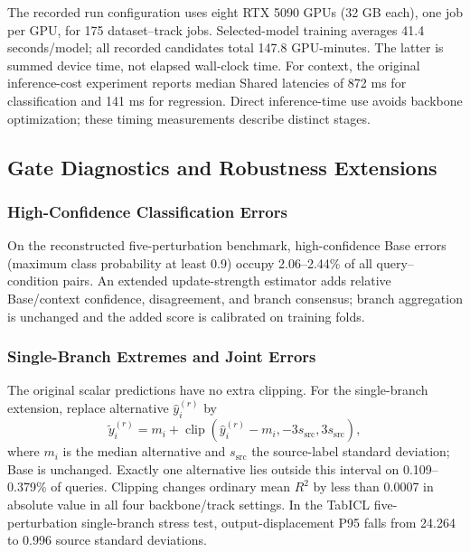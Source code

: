 


The recorded run configuration uses eight RTX 5090 GPUs (32 GB each), one job
per GPU, for 175 dataset--track jobs. Selected-model training averages
41.4 seconds/model; all recorded candidates total 147.8 GPU-minutes. The latter
is summed device time, not elapsed wall-clock time. For context, the original
inference-cost experiment reports median Shared latencies of 872 ms for
classification and 141 ms for regression. Direct inference-time use avoids
backbone optimization; these timing measurements describe distinct stages.

\subsection{Gate Diagnostics and Robustness Extensions}
\label{app:revision-gate}
\subsubsection{High-Confidence Classification Errors}
\label{app:revision-high-confidence}
On the reconstructed five-perturbation benchmark, high-confidence Base errors
(maximum class probability at least 0.9) occupy 2.06--2.44\% of all
query--condition pairs. An extended update-strength estimator adds relative
Base/context confidence, disagreement, and branch consensus; branch aggregation
is unchanged and the added score is calibrated on training folds.




\subsubsection{Single-Branch Extremes and Joint Errors}
\label{app:revision-regression-robustness}
The original scalar predictions have no extra clipping. For the single-branch
extension, replace alternative $\widehat y_i^{(r)}$ by
\[
\widetilde y_i^{(r)}=m_i+\operatorname{clip}
 (\widehat y_i^{(r)}-m_i,-3s_{\mathrm{src}},3s_{\mathrm{src}}),
\]
where $m_i$ is the median alternative and $s_{\mathrm{src}}$ the source-label
standard deviation; Base is unchanged. Exactly one alternative lies outside
this interval on 0.109--0.379\% of queries. Clipping changes ordinary mean
$R^2$ by less than 0.0007 in absolute value in all four backbone/track settings.
In the TabICL five-perturbation single-branch stress test, output-displacement
P95 falls from 24.264 to 0.996 source standard deviations.

